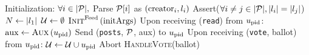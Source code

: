 \begin{algorithm}[H]
  \caption{$\gfunc\left(\textsc{Init}^{\gfuncname}, \textsc{Aux},
  \textsc{HandleVote}\right)\left(\postlist, \mathrm{initArgs}\right)$}
  \label{alg:gfunc}
  \begin{algorithmic}[1]
    \State Initialization:
    \Indent
      \State $\forall i \in |\mathcal{P}|,$ Parse $\mathcal{P}[i]$ as
      $\left(\mathrm{creator}_i, l_i\right)$
      \State Assert($\forall i \neq j \in |\mathcal{P}|, |l_i| =
      |l_j|$)
      \State $N \gets |l_1|$
      \State $\mathcal{U} \gets \emptyset$
      \State $\textsc{Init}^{\mathrm{Feed}}\left(\mathrm{initArgs}\right)$
    \EndIndent
    \State
    \State Upon receiving (\texttt{read}) from $u_{\mathrm{pid}}$:
    \Indent
      \State $\mathrm{aux} \gets \textsc{Aux}\left(u_{\mathrm{pid}}\right)$
      \State Send (\texttt{posts}, $\mathcal{P}$, aux) to $u_{\mathrm{pid}}$
    \EndIndent
    \State
    \State Upon receiving (\texttt{vote}, ballot) from
    $u_{\mathrm{pid}}$:
     \Indent
       \State $\mathcal{U} \gets \mathcal{U} \cup u_{\mathrm{pid}}$
       \If{$|\playerlist| > \playerlen$}
         \State Abort
       \EndIf
       \State \textsc{HandleVote}(ballot)
     \EndIndent
  \end{algorithmic}
\end{algorithm}
